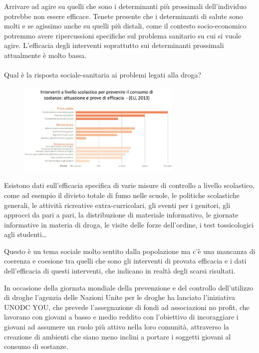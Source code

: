Arrivare ad agire su quelli che sono i determinanti più prossimali
dell'individuo potrebbe non essere efficace. Tenete presente che i
determinanti di salute sono molti e se agissimo anche su quelli più
distali, come il contesto socio-economico potremmo avere ripercussioni
specifiche sul problema sanitario su cui si vuole agire. L'efficacia
degli interventi soprattutto sui determinanti prossimali attualmente è
molto bassa.
\\\\
Qual è la risposta sociale-sanitaria ai problemi legati alla droga?

\begin{figure}[!ht]
\centering
	\includegraphics[width=0.7\textwidth]{18/image8.jpeg}
\end{figure}

Esistono dati sull'efficacia
specifica di varie misure di controllo a livello scolastico, come ad
esempio il divieto totale di fumo nelle scuole, le politiche scolastiche
generali, le attività ricreative extra-curricolari, gli eventi per i
genitori, gli approcci da pari a pari, la distribuzione di materiale
informativo, le giornate informative in materia di droga, le visite
delle forze dell'ordine, i test tossicologici agli studenti\ldots{}

Questo è un tema sociale molto sentito dalla popolazione ma c'è una
mancanza di coerenza e coesione tra quelli che sono gli interventi di
provata efficacia e i dati dell'efficacia di questi interventi, che
indicano in realtà degli scarsi risultati.

In occasione della giornata mondiale della prevenzione e del controllo
dell'utilizzo di droghe l'agenzia delle Nazioni Unite per le droghe ha
lanciato l'iniziativa UNODC YOU, che prevede l'assegnazione di fondi ad
associazioni no profit, che lavorano con giovani a basso e medio reddito
con l'obiettivo di incoraggiare i giovani ad assumere un ruolo più
attivo nella loro comunità, attraverso la creazione di ambienti che
siano meno inclini a portare i soggetti giovani al consumo di sostanze.

